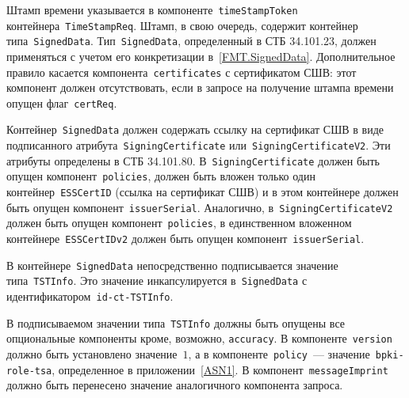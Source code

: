Штамп времени указывается в компоненте~\texttt{timeStampToken}
контейнера~\texttt{TimeStampReq}. Штамп, в свою очередь, содержит 
контейнер типа~\texttt{SignedData}.
%
Тип~\texttt{SignedData}, определенный в СТБ 34.101.23, должен применяться с
учетом его конкретизации в~\ref{FMT.SignedData}. Дополнительное правило 
касается компонента~\texttt{certificates} с сертификатом СШВ:
этот компонент должен отсутствовать, если в запросе на получение штампа 
времени опущен флаг~\texttt{certReq}.

Контейнер~\texttt{SignedData} должен содержать ссылку на сертификат СШВ
в виде подписанного атрибута~\texttt{SigningCertificate} 
или~\texttt{SigningCertificateV2}. Эти атрибуты определены в СТБ 
34.101.80.  
%
В~\texttt{SigningCertificate} должен быть опущен 
компонент~\texttt{policies}, должен быть вложен только один 
контейнер~\texttt{ESSCertID} (ссылка на сертификат СШВ) и в этом 
контейнере должен быть опущен компонент~\texttt{issuerSerial}.
%
Аналогично, в~\texttt{SigningCertificateV2} должен быть опущен 
компонент~\texttt{policies}, в единственном вложенном 
контейнере~\texttt{ESSCertIDv2} должен быть опущен 
компонент~\texttt{issuerSerial}.

В контейнере~\texttt{SignedData} непосредственно подписывается 
значение типа~\texttt{TSTInfo}. Это значение инкапсулируется 
в~\texttt{SignedData} с идентификатором~\texttt{id-ct-TSTInfo}.

В подписываемом значении типа~\texttt{TSTInfo} должны быть опущены
все опциональные компоненты кроме, возможно, \texttt{accuracy}.
%
В компоненте~\texttt{version} должно быть установлено значение~$1$,
а в компоненте~\texttt{policy}~--- значение~\texttt{bpki-role-tsa},
определенное в приложении~\ref{ASN1}.
%
В компонент~\texttt{messageImprint} должно быть перенесено
значение аналогичного компонента запроса.

